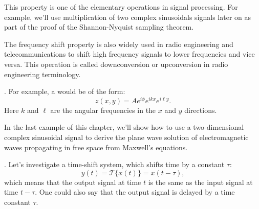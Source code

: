 This property is one of the elementary operations in signal
processing. For example, we'll use multiplication of two complex sinusoidals
signals later on as part of the proof of the Shannon-Nyquist sampling theorem.

The frequency shift property is also widely used in radio engineering and
telecommunications to shift high frequency signals to lower frequencies and vice versa.
This operation is called downconversion or upconversion in radio engineering terminology.

.
For example, a  would be of the form:
\begin{equation}
  z(x,y) = A e^{i\phi} e^{i k x} e^{i \ell y}.
\end{equation}
Here $k$ and $\ell$ are the angular frequencies in the $x$ and $y$ directions.

In the last example of this chapter, we'll show how to use a two-dimensional
complex sinusoidal signal to derive the plane wave solution of electromagnetic
waves propagating in free space from Maxwell's equations.

.
Let's investigate a time-shift system, which shifts time by a constant $\tau$:
\begin{equation}
  y(t) = \mathcal{T}\{x(t)\} = x(t-\tau),
\end{equation}
which means that the output signal at time $t$ is the same as the input signal at
time $t-\tau$. One could also say that the output signal is delayed by a time constant $\tau$.

